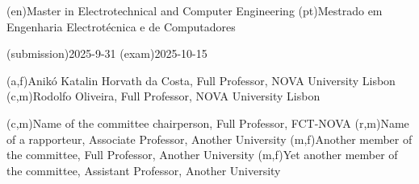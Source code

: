 \ntauthordegree(en){Master in Electrotechnical and Computer Engineering}
\ntauthordegree(pt){Mestrado em Engenharia Electrotécnica e de Computadores}

\ntdate(submission){2025-9-31}
\ntdate(exam){2025-10-15}

(a,f){Anikó Katalin Horvath da Costa, Full Professor, NOVA University Lisbon}
(c,m){Rodolfo Oliveira, Full Professor, NOVA University Lisbon}

(c,m){Name of the committee chairperson, Full Professor, FCT-NOVA}
(r,m){Name of a rapporteur, Associate Professor, Another University}
(m,f){Another member of the committee, Full Professor, Another University}
(m,f){Yet another member of the committee, Assistant Professor, Another University}
